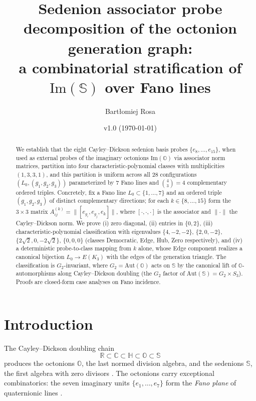 \documentclass[12pt,a4paper]{article}
\title{Sedenion associator probe decomposition of the octonion generation graph:\\ a combinatorial stratification of $\mathrm{Im}(\mathbb{S})$ over Fano lines}
\author{Bart{\l}omiej Rosa}
\date{v1.0 (\today)}
\begin{document}
\maketitle

\begin{abstract}
We establish that the eight Cayley--Dickson sedenion basis probes $\{e_8, \ldots, e_{15}\}$, when used as external probes of the imaginary octonions $\mathrm{Im}(\mathbb{O})$ via associator norm matrices, partition into four characteristic-polynomial classes with multiplicities $(1, 3, 3, 1)$, and this partition is uniform across all 28 configurations $(L_0, (g_1, g_2, g_3))$ parameterized by 7 Fano lines and $\binom{4}{3} = 4$ complementary ordered triples. Concretely, fix a Fano line $L_0 \subset \{1, \ldots, 7\}$ and an ordered triple $(g_1, g_2, g_3)$ of distinct complementary directions; for each $k \in \{8, \ldots, 15\}$ form the $3 \times 3$ matrix $A^{(k)}_{ij} = \|[e_{g_i}, e_{g_j}, e_k]\|$, where $[\cdot, \cdot, \cdot]$ is the associator and $\|\cdot\|$ the Cayley--Dickson norm. We prove (i) zero diagonal, (ii) entries in $\{0, 2\}$, (iii) characteristic-polynomial classification with eigenvalues $\{4, -2, -2\}$, $\{2, 0, -2\}$, $\{2\sqrt{2}, 0, -2\sqrt{2}\}$, $\{0, 0, 0\}$ (classes Democratic, Edge, Hub, Zero respectively), and (iv) a deterministic probe-to-class mapping from $k$ alone, whose Edge component realizes a canonical bijection $L_0 \to E(K_3)$ with the edges of the generation triangle. The classification is $G_2$-invariant, where $G_2 = \mathrm{Aut}(\mathbb{O})$ acts on $\mathbb{S}$ by the canonical lift of $\mathbb{O}$-automorphisms along Cayley--Dickson doubling (the $G_2$ factor of $\mathrm{Aut}(\mathbb{S}) = G_2 \times S_3$). Proofs are closed-form case analyses on Fano incidence.
\end{abstract}

\tableofcontents

\section{Introduction}
The Cayley--Dickson doubling chain
\[
\mathbb{R}\subset \mathbb{C}\subset \mathbb{H}\subset \mathbb{O}\subset \mathbb{S}
\]
produces the octonions $\mathbb{O}$, the last normed division algebra, and the sedenions $\mathbb{S}$, the first algebra with zero divisors \cite{Schafer1966,ConwaySmith2003,Cawagas2004}.
The octonions carry exceptional combinatorics: the seven imaginary units $\{e_1,\dots,e_7\}$ form the \emph{Fano plane} of quaternionic lines \cite{Baez2002}.
\end{document}
